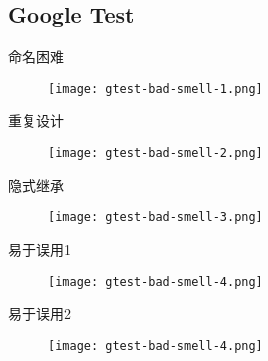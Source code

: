 \subsection{Google Test}

\begin{frame}{命名困难}
    \centering
    \begin{figure}
      \centering
      \texttt{[image: gtest-bad-smell-1.png]}
    \end{figure}
\end{frame}

\begin{frame}{重复设计}
    \centering
    \begin{figure}
      \centering
      \texttt{[image: gtest-bad-smell-2.png]}
    \end{figure}
\end{frame}

\begin{frame}{隐式继承}
    \centering
    \begin{figure}
      \centering
      \texttt{[image: gtest-bad-smell-3.png]}
    \end{figure}
\end{frame}

\begin{frame}{易于误用1}
    \centering
    \begin{figure}
      \centering
      \texttt{[image: gtest-bad-smell-4.png]}
    \end{figure}
\end{frame}

\begin{frame}{易于误用2}
    \centering
    \begin{figure}
      \centering
      \texttt{[image: gtest-bad-smell-4.png]}
    \end{figure}
\end{frame}

